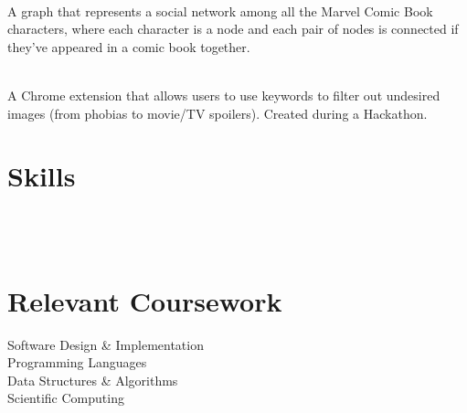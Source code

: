 \documentclass[]{resume-openfont}
\begin{document}
\hfill \\
A graph that represents a social network among all the Marvel Comic Book characters, where each character is a node and each pair of nodes is connected if they've appeared in a comic book together.
\sectionsep

\\
A Chrome extension that allows users to use keywords to filter out undesired images (from phobias to movie/TV spoilers). Created during a Hackathon.
\sectionsep

\section{Skills}
\begin{resumeSkillList}
    \\
    \\
\end{resumeSkillList}
\sectionsep

\section{Relevant Coursework}
 {Software Design \& Implementation} \\
 {Programming Languages} \\
 {Data Structures \& Algorithms} \\
 {Scientific Computing}
\end{document}
